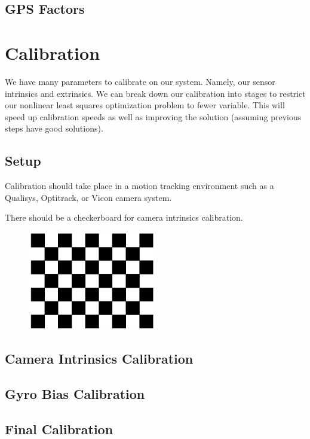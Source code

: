 \documentclass[11pt]{article}
\begin{document}
\subsection{GPS Factors}

\section{Calibration}
We have many parameters to calibrate on our system. Namely, our sensor intrinsics and extrinsics. We can break down our calibration into stages to restrict our nonlinear least squares optimization problem to fewer variable. This will speed up calibration speeds as well as improving the solution (assuming previous steps have good solutions).

\subsection{Setup}
Calibration should take place in a motion tracking environment such as a Qualisys, Optitrack, or Vicon camera system.

There should be a checkerboard for camera intrinsics calibration.
\begin{figure}[H]
\centering
\includegraphics[width=0.5\textwidth]{checkerboard}
\end{figure}

\subsection{Camera Intrinsics Calibration}

\subsection{Gyro Bias Calibration}
\subsection{Final Calibration}
\end{document}
